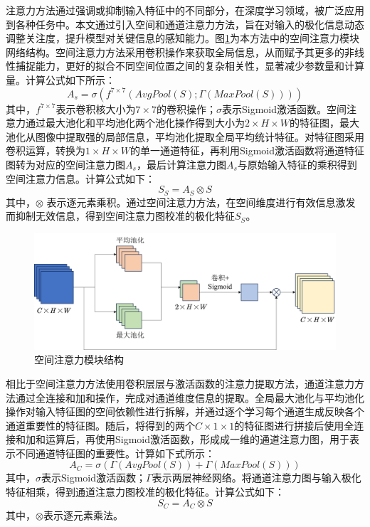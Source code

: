 注意力方法通过强调或抑制输入特征中的不同部分，在深度学习领域，被广泛应用到各种任务中。本文通过引入空间和通道注意力方法，旨在对输入的极化信息动态调整关注度，提升模型对关键信息的感知能力。图\ref{fig:spatial}为本方法中的空间注意力模块网络结构。空间注意力方法采用卷积操作来获取全局信息，从而赋予其更多的非线性捕捉能力，更好的拟合不同空间位置之间的复杂相关性，显著减少参数量和计算量。计算公式如下所示：
\begin{equation}
    A_s=\sigma(f^{7\times 7}(AvgPool(S);\Gamma(MaxPool(S))))
\end{equation}
其中，$f^{7\times 7}$表示卷积核大小为$7\times 7$的卷积操作；$\sigma$表示Sigmoid激活函数。空间注意力通过最大池化和平均池化两个池化操作得到大小为$2\times H \times W$的特征图，最大池化从图像中提取强的局部信息，平均池化提取全局平均统计特征。对特征图采用卷积运算，转换为$1\times H\times W$的单一通道特征，再利用Sigmoid激活函数将通道特征图转为对应的空间注意力图$A_s$，最后计算注意力图$A_s$与原始输入特征的乘积得到空间注意力信息。计算公式如下：
\begin{equation}
    S_S=A_S \otimes S
\end{equation}
其中，$\otimes$ 表示逐元素乘积。通过空间注意力方法，在空间维度进行有效信息激发而抑制无效信息，得到空间注意力图校准的极化特征$S_S$。

\begin{figure}[ht!]
    \centering
    \includegraphics[width=14cm]{pic/chapter3/Spatial.png}
    \caption{空间注意力模块结构}
    \label{fig:spatial}
\end{figure}

相比于空间注意力方法使用卷积层层与激活函数的注意力提取方法，通道注意力方法通过全连接和加和操作，完成对通道维度信息的提取。全局最大池化与平均池化操作对输入特征图的空间依赖性进行拆解，并通过逐个学习每个通道生成反映各个通道重要性的特征图。随后，将得到的两个$C\times 1 \times 1$的特征图进行拼接后使用全连接和加和运算后，再使用Sigmoid激活函数，形成成一维的通道注意力图，用于表示不同通道特征图的重要性。计算如下式所示：
\begin{equation}
    A_C=\sigma(\Gamma(AvgPool(S))+\Gamma(MaxPool(S)))
\end{equation}
其中，$\sigma$表示Sigmoid激活函数；$\Gamma$表示两层神经网络。将通道注意力图与输入极化特征相乘，得到通道注意力图校准的极化特征。计算公式如下：
\begin{equation}
    S_C=A_C \otimes S
\end{equation}
其中，$\otimes$表示逐元素乘法。

